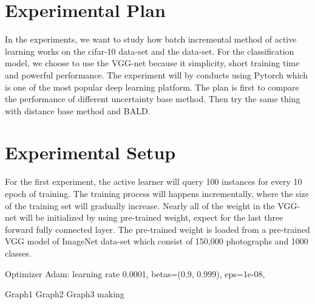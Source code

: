 \section{Experimental Plan}
\label{sec:experimentalPlan}
In the experiments, we want to study how batch incremental method of active learning works on the cifar-10 data-set and the data-set. For the classification model, we choose to use the VGG-net because it simplicity, short training time and powerful performance. The experiment will by conducts using Pytorch which is one of the most popular deep learning platform. 
The plan is first to compare the performance of different uncertainty base method. Then try the same thing with distance base method and BALD.



\section{Experimental Setup}

\label{sec:experimentalSetup}
For the first experiment, the active learner will query 100 instances for every 10 epoch of training. The training process will happens incrementally, where the size of the training set will gradually increase. Nearly all of the weight in the VGG-net will be initialized by using pre-trained weight, expect for the last three forward fully connected layer. The pre-trained weight is loaded from a pre-trained VGG model of ImageNet data-set which consist of 150,000 photographs and  1000 classes.




Optimizer Adam:
learning rate 0.0001, 
betas=(0.9, 0.999),
eps=1e-08, 

Graph1
Graph2
Graph3 making
